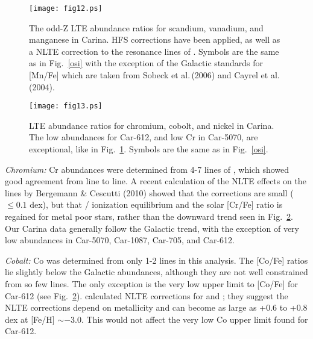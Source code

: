 \documentclass{emulateapj}
\newcommand\etal{{\rm et al.\,}}
\begin{document}



\begin{figure}[t]
\texttt{[image: fig12.ps]}
\caption{
The odd-Z LTE abundance ratios for scandium, vanadium,
and manganese in Carina.  HFS corrections have been applied,
as well as a NLTE correction to the resonance lines of 
.  Symbols are the same as in Fig.~\ref{osi}
with the exception of the Galactic standards for [Mn/Fe]
which are taken from Sobeck \etal (2006) and Cayrel \etal (2004).  \\
}
\label{scvmn}
\end{figure}

\begin{figure}[t]
\texttt{[image: fig13.ps]}
\caption{
LTE abundance ratios for chromium, cobolt, and nickel in Carina.
The low abundances for Car-612, and low Cr in Car-5070, are
exceptional, like in Fig.~\ref{scvmn}.
Symbols are the same as in Fig.~\ref{osi}.  \\
 }
\label{crconi}
\end{figure}


{\it Chromium:} Cr abundances were determined from 4-7
lines of , which showed good agreement from line to line.
A recent calculation of the NLTE 
effects on the  lines by Bergemann \& Cescutti 
(2010) showed that the corrections are small ($\le 0.1$ dex), 
but that / ionization 
equilibrium and the solar [Cr/Fe] ratio is regained for metal 
poor stars, rather than the downward trend seen in Fig.~\ref{crconi}.  
Our Carina data generally follow the Galactic trend, with
the exception of very low abundances in 
Car-5070, Car-1087, Car-705, and Car-612.  


{\it Cobalt:}  
Co was determined from only 1-2 lines in this analysis.
The [Co/Fe] ratios lie slightly below the Galactic 
abundances, although they are not well constrained from so
few lines.  The only exception is the very low upper limit 
to [Co/Fe] for Car-612 (see Fig.~\ref{crconi}).
\citet{Ber10} calculated NLTE corrections for 
 and ; they suggest the NLTE 
corrections depend on metallicity and can become as large as 
+0.6 to +0.8 dex at [Fe/H] $\sim -3.0$.   This would  not
affect the very low Co upper limit found for Car-612.
\end{document}
